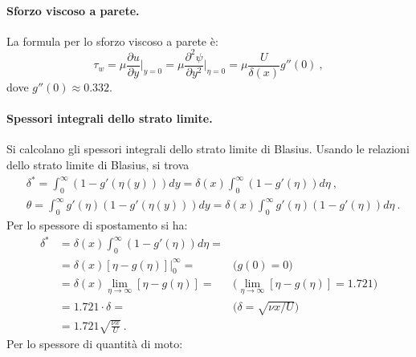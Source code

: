 \paragraph{Sforzo viscoso a parete.}
La formula per lo sforzo viscoso a parete è:
\begin{equation}
  \tau_w = \mu \frac{\partial u}{\partial y}\Bigg|_{y=0} = \mu \frac{\partial^2 \psi}{\partial y^2}\Bigg|_{\eta=0} =  \mu \frac{U}{\delta(x)} g''(0) \ ,
\end{equation}
dove $g''(0) \approx 0.332$.

\paragraph{Spessori integrali dello strato limite.}
Si calcolano gli spessori integrali dello strato limite di Blasius.
%
 Usando le relazioni dello strato limite di Blasius, si trova
 \begin{equation}
 \begin{aligned}
 & \delta^* = \int_0^\infty (1 - g'(\eta(y))) dy = 
     \delta(x) \int_0^\infty (1 - g'(\eta)) d\eta \ , \\
 & \theta   = \int_0^\infty g'(\eta) (1 - g'(\eta(y))) dy = 
     \delta(x) \int_0^\infty g'(\eta) (1 - g'(\eta)) d\eta \ .
 \end{aligned}
 \end{equation}
% 
 Per lo spessore di spostamento si ha:
 \begin{equation}
 \begin{aligned}
  \delta^* & = \delta(x) \int_0^\infty (1 - g'(\eta)) d\eta = 
         & \\
           & = \delta(x) [\eta - g(\eta)]|_0^\infty = 
         & \text{($g(0) = 0$)} \\
           & = \delta(x) \lim_{\eta \to \infty} [\eta - g(\eta)] = 
         & \text{($\lim_{\eta \to \infty} [\eta - g(\eta)] = 1.721$)} \\
           & = 1.721 \cdot \delta = 
         & \text{($\delta = \sqrt{\nu x / U}$)} \\
           & = 1.721 \sqrt{\frac{\nu x}{U}} \ .
 \end{aligned}
 \end{equation}
% 
 Per lo spessore di quantità di moto:
